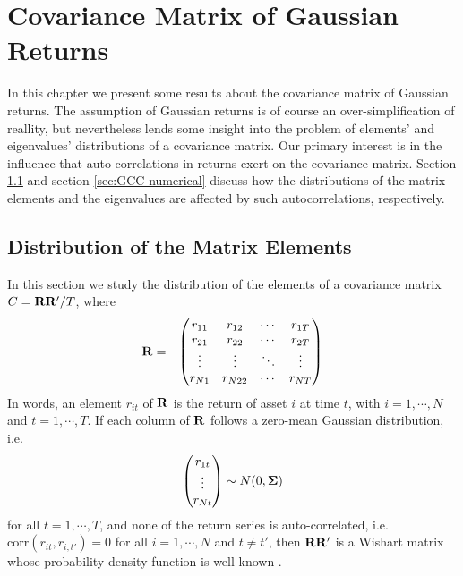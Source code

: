 \chapter{Covariance Matrix of Gaussian Returns}
\label{chp:Gaussian}
In this chapter we present some results about the covariance
matrix of Gaussian returns. The assumption of Gaussian returns is of
course an over-simplification of reallity, but nevertheless lends some
insight into the problem of elements' and eigenvalues' distributions of
a covariance matrix.
Our primary interest is in the influence that auto-correlations in
returns exert on the covariance matrix. Section \ref{sec:GCC-analytical} and
section \ref{sec:GCC-numerical} discuss how the distributions of the matrix
elements and the eigenvalues are affected by such autocorrelations,
respectively.

\section{Distribution of the Matrix Elements}
\label{sec:GCC-analytical}
In this section we study the distribution of the elements of a
covariance matrix $C = \mathbf{RR'}/T$, where
\begin{eqnarray*}
  \mathbf{R} &=&
  \begin{pmatrix}
    r_{11} & r_{12} & \cdots & r_{1T} \\
    r_{21} & r_{22} & \cdots & r_{2T} \\
    \vdots & \vdots & \ddots & \vdots \\
    r_{N1} & r_{N22} & \cdots & r_{NT} \\
  \end{pmatrix}
\end{eqnarray*}
In words, an element $r_{it}$ of $\mathbf{R}$ is the return of asset $i$
at time $t$, with $i=1,\cdots, N$ and $t = 1, \cdots, T$. If each
column of $\mathbf{R}$ follows a zero-mean Gaussian distribution, i.e.
\begin{eqnarray*}
  \begin{pmatrix}
    r_{1t} \\
    \vdots \\
    r_{Nt}
  \end{pmatrix} \sim N(0, \mathbf{\Sigma})
\end{eqnarray*}
for all $t = 1, \cdots, T$, and none of the return series is
auto-correlated, i.e. $\text{corr}(r_{it}, r_{i,t'}) = 0$ for all $i =
1, \cdots, N$ and $t \neq t'$, then $\mathbf{RR'}$ is a Wishart matrix whose
probability density function is well known \cite{Anderson2003}.

